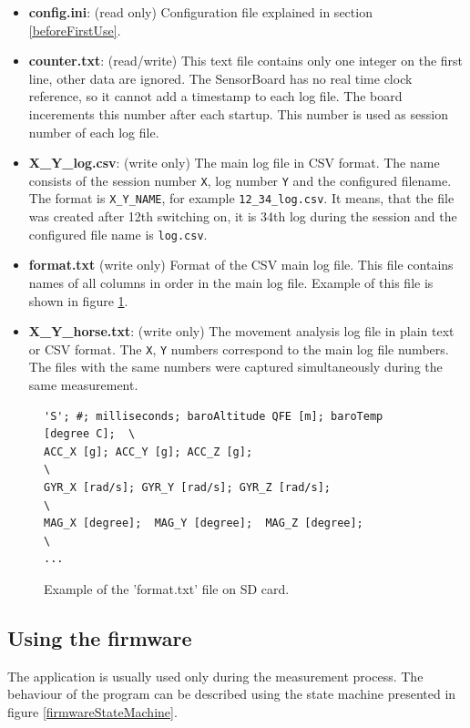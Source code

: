 \begin{itemize}
	\item \textbf{config.ini}: (read only) Configuration file explained in section \ref{beforeFirstUse}.
	\item \textbf{counter.txt}: (read/write) This text file contains only one integer on the first line, other data are ignored. The SensorBoard has no real time clock reference, so it cannot add a timestamp to each log file. The board incerements this number after each startup. This number is used as session number of each log file.
	\item \textbf{X\_Y\_log.csv}: (write only) The main log file in CSV format. The name consists of the session number \texttt{X}, log number \texttt{Y} and the configured filename. The format is \texttt{X\_Y\_NAME}, for example \texttt{12\_34\_log.csv}. It means, that the file was created after 12th switching on, it is 34th log during the session and the configured file name is \texttt{log.csv}.
	\item \textbf{format.txt} (write only) Format of the CSV main log file. This file contains names of all columns in order in the main log file. Example of this file is shown in figure \ref{formatFile}.
	\item \textbf{X\_Y\_horse.txt}: (write only) The movement analysis log file in plain text or CSV format. The \texttt{X}, \texttt{Y} numbers correspond to the main log file numbers. The files with the same numbers were captured simultaneously during the same measurement.
\end{itemize}

\begin{figure}
	\centering
	\label{formatFile}
	\caption{Example of the 'format.txt' file on SD card.}
	\begin{verbatim}
'S'; #; milliseconds; baroAltitude QFE [m]; baroTemp [degree C];  \
ACC_X [g]; ACC_Y [g]; ACC_Z [g];                                  \
GYR_X [rad/s]; GYR_Y [rad/s]; GYR_Z [rad/s];                      \
MAG_X [degree];  MAG_Y [degree];  MAG_Z [degree];                 \
...
	\end{verbatim}
\end{figure}

\subsection{Using the firmware}
The application is usually used only during the measurement process. The behaviour of the program can be described using the state machine presented in figure \ref{firmwareStateMachine}.

